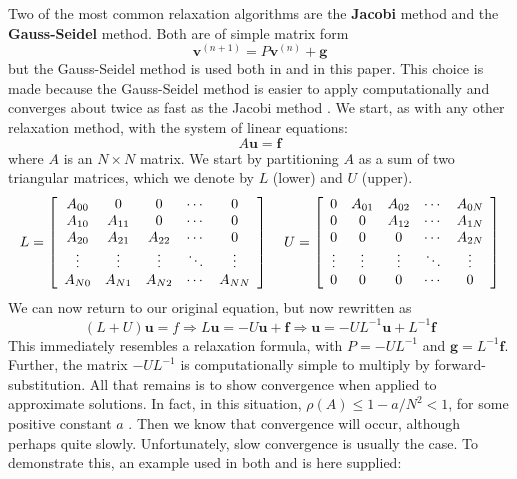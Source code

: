 Two of the most common relaxation algorithms are the \textbf{Jacobi} method and the \textbf{Gauss-Seidel} method. Both are of simple matrix form \[\textbf{v}^{(n+1)}=P\textbf{v}^{(n)}+\textbf{g}\] but the Gauss-Seidel method is used both in \cite{lee14} and in this paper. This choice is made because the Gauss-Seidel method is easier to apply computationally \cite{briggs87} and converges about twice as fast as the Jacobi method \cite{lee14}. We start, as with any other relaxation method, with the system of linear equations:
\[A\textbf{u}=\textbf{f}\]
where $A$ is an $N\times N$ matrix. We start by partitioning $A$ as a sum of two triangular matrices, which we denote by $L$ (lower) and $U$ (upper).
\[L=
\left[\begin{array}{ccccc}
A_{00} & 0 & 0 & \cdots & 0 \\
A_{10} & A_{11} & 0 & \cdots & 0 \\
A_{20} & A_{21} & A_{22} & \cdots & 0 \\
\vdots & \vdots & \vdots & \ddots & \vdots \\
A_{N0} & A_{N1} & A_{N2} & \cdots & A_{NN}
\end{array}\right]
\hspace{.15in}
U=
\left[\begin{array}{ccccc}
0 & A_{01} & A_{02} & \cdots & A_{0N} \\
0 & 0 & A_{12} & \cdots & A_{1N} \\
0 & 0 & 0 & \cdots & A_{2N} \\
\vdots & \vdots & \vdots & \ddots & \vdots \\
0 & 0 & 0 & \cdots & 0
\end{array}\right]\]
We can now return to our original equation, but now rewritten as
\[(L+U)\textbf{u}=f\Rightarrow
L\textbf{u}=-U\textbf{u}+\textbf{f}\Rightarrow
\textbf{u}=-UL^{-1}\textbf{u}+L^{-1}\textbf{f}\]
This immediately resembles a relaxation formula, with $P=-UL^{-1}$ and $\textbf{g}=L^{-1}\textbf{f}$. Further, the matrix $-UL^{-1}$ is computationally simple to multiply by forward-substitution. All that remains is to show convergence when applied to approximate solutions. In fact, in this situation, $\rho(A)\leq 1-a/N^2<1$, for some positive constant $a$ \cite{lee14}. Then we know that convergence will occur, although perhaps quite slowly. Unfortunately, slow convergence is usually the case. To demonstrate this, an example used in both \cite{lee14} and \cite{briggs87} is here supplied:
